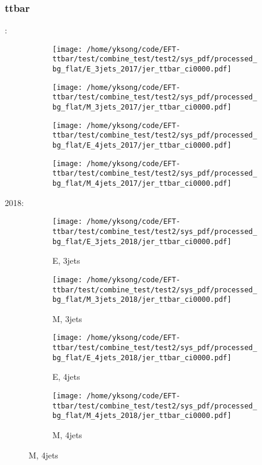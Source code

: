 \documentclass{beamer}
\begin{document}
\begin{frame}
\frametitle{ttbar}
\fontsize{5}{1}:
\begin{figure}
\centering
\begin{subfigure}[b]{0.24\textwidth}
\texttt{[image: /home/yksong/code/EFT-ttbar/test/combine\_test/test2/sys\_pdf/processed\_bg\_flat/E\_3jets\_2017/jer\_ttbar\_ci0000.pdf]}
\end{subfigure}
\begin{subfigure}[b]{0.24\textwidth}
\texttt{[image: /home/yksong/code/EFT-ttbar/test/combine\_test/test2/sys\_pdf/processed\_bg\_flat/M\_3jets\_2017/jer\_ttbar\_ci0000.pdf]}
\end{subfigure}
\begin{subfigure}[b]{0.24\textwidth}
\texttt{[image: /home/yksong/code/EFT-ttbar/test/combine\_test/test2/sys\_pdf/processed\_bg\_flat/E\_4jets\_2017/jer\_ttbar\_ci0000.pdf]}
\end{subfigure}
\begin{subfigure}[b]{0.24\textwidth}
\texttt{[image: /home/yksong/code/EFT-ttbar/test/combine\_test/test2/sys\_pdf/processed\_bg\_flat/M\_4jets\_2017/jer\_ttbar\_ci0000.pdf]}
\end{subfigure}
\end{figure}
2018:
\begin{figure}
\centering
\begin{subfigure}[b]{0.24\textwidth}
\texttt{[image: /home/yksong/code/EFT-ttbar/test/combine\_test/test2/sys\_pdf/processed\_bg\_flat/E\_3jets\_2018/jer\_ttbar\_ci0000.pdf]}
\captionsetup{font=tiny}
\caption{E, 3jets}
\end{subfigure}
\begin{subfigure}[b]{0.24\textwidth}
\texttt{[image: /home/yksong/code/EFT-ttbar/test/combine\_test/test2/sys\_pdf/processed\_bg\_flat/M\_3jets\_2018/jer\_ttbar\_ci0000.pdf]}
\captionsetup{font=tiny}
\caption{M, 3jets}
\end{subfigure}
\begin{subfigure}[b]{0.24\textwidth}
\texttt{[image: /home/yksong/code/EFT-ttbar/test/combine\_test/test2/sys\_pdf/processed\_bg\_flat/E\_4jets\_2018/jer\_ttbar\_ci0000.pdf]}
\captionsetup{font=tiny}
\caption{E, 4jets}
\end{subfigure}
\begin{subfigure}[b]{0.24\textwidth}
\texttt{[image: /home/yksong/code/EFT-ttbar/test/combine\_test/test2/sys\_pdf/processed\_bg\_flat/M\_4jets\_2018/jer\_ttbar\_ci0000.pdf]}
\captionsetup{font=tiny}
\caption{M, 4jets}
\end{subfigure}
\end{figure}
\end{frame}
\end{document}
